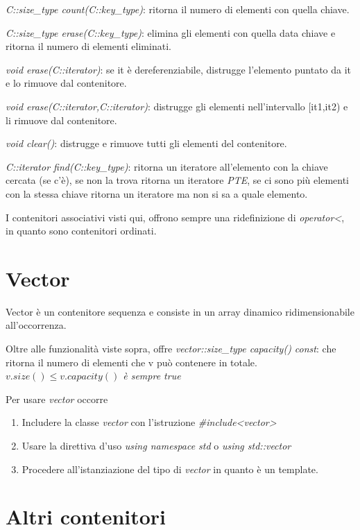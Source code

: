 \begin{description}
	\item \textit{C::size\_type count(C::key\_type)}: ritorna il numero di elementi con quella chiave.
	\item \textit{C::size\_type erase(C::key\_type)}: elimina gli elementi con quella data chiave e ritorna il numero di elementi eliminati.
	\item \textit{void erase(C::iterator)}: se it è dereferenziabile, distrugge l'elemento puntato da it e lo rimuove dal contenitore.
	\item \textit{void erase(C::iterator,C::iterator)}: distrugge gli elementi nell'intervallo [it1,it2) e li rimuove dal contenitore.
	\item \textit{void clear()}: distrugge e rimuove tutti gli elementi del contenitore.
	\item \textit{C::iterator find(C::key\_type)}: ritorna un iteratore all'elemento con la chiave cercata (se c'è), se non la trova ritorna un iteratore \textit{PTE}, se ci sono più elementi con la stessa chiave ritorna un iteratore ma non si sa a quale elemento.
\end{description}

I contenitori associativi visti qui, offrono sempre una ridefinizione di \textit{operator<}, in quanto sono contenitori ordinati.

\section{Vector}
Vector è un contenitore sequenza e consiste in un array dinamico ridimensionabile all'occorrenza.

Oltre alle funzionalità viste sopra, offre \textit{vector::size\_type capacity() const}: che ritorna il numero di elementi che v può contenere in totale. 
\textit{$ v.size() \leq v.capacity() $ è sempre true}

Per usare \textit{vector} occorre
\begin{enumerate}
	\item Includere la classe \textit{vector} con l'istruzione \textit{\#include<vector>}
	\item Usare la direttiva d'uso \textit{using namespace std} o \textit{using std::vector}
	\item Procedere all'istanziazione del tipo di \textit{vector} in quanto è un template.
\end{enumerate}

\section{Altri contenitori}

